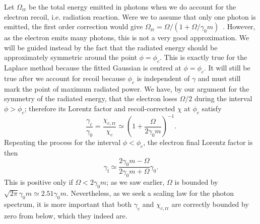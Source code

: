 \documentclass[reprint,superscriptaddress,amsmath,amssymb,aps,pra]{revtex4-1}
\newcommand{\chicrr}{\chi_{c,\mathrm{rr}}}
\begin{document}
Let $\Omega_\text{rr}$ be the total energy emitted in photons when we do account for
the electron recoil, i.e. radiation reaction. Were we to assume that only
one photon is emitted, the first order correction would give
$\Omega_\text{rr} = \Omega / (1 + \Omega / \gamma_0 m)$~\cite{Schwinger,Lindhard}.
However, as the electron emits many photons, this is not a very good approximation. We will
be guided instead by the fact that the radiated energy should be approximately
symmetric around the point $\phi = \phi_c$. This is exactly true for the
Laplace method because the fitted Gaussian is centred at $\phi = \phi_c$.
It will still be true after we account for recoil because $\phi_c$ is
independent of $\gamma$ and must still mark the point of maximum radiated
power. We have, by our argument for the symmetry of the radiated energy,
that the electron loses $\Omega/2$ during the interval
$\phi > \phi_c$; therefore its Lorentz factor and recoil-corrected
$\chi$ at $\phi_c$ satisfy
	\begin{equation}
	\frac{\gamma_c}{\gamma_0} =
		\frac{\chicrr}{\chi_c} \simeq
		\left(1 + \frac{\Omega}{2 \gamma_0 m}\right)^{-1}.
	\label{eq:MidPointGamma}
	\end{equation}
Repeating the process for the interval $\phi < \phi_c$, the electron final
Lorentz factor is then
	\begin{equation}
	\gamma_\mathrm{f} \simeq
		\frac{2\gamma_0 m - \Omega}{2\gamma_0 m + \Omega}
		\gamma_0.
	\end{equation}
This is positive only if $\Omega < 2 \gamma_0 m$; as we saw earlier,
$\Omega$ is bounded by $\sqrt{2\pi}\gamma_0m \simeq 2.51\gamma_0 m$.
Nevertheless, as we seek a scaling law for the photon spectrum, it is
more important that both $\gamma_c$ and $\chicrr$ are
correctly bounded by zero from below, which they indeed are.
\end{document}
